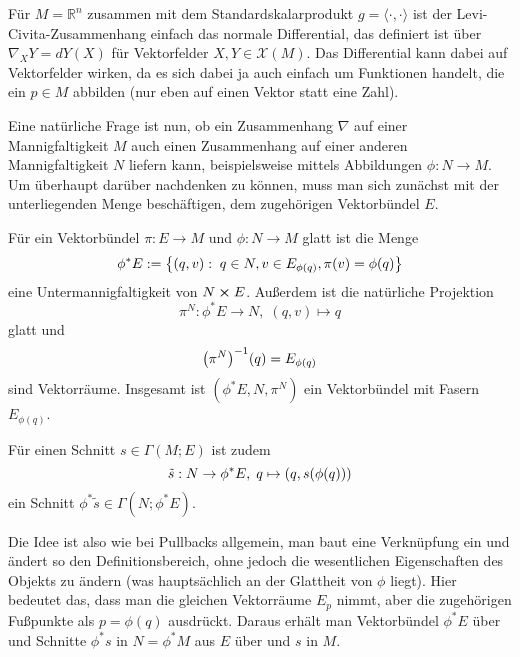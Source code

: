 \documentclass[../H_Analysis_main.tex]{subfiles}
\begin{document}
\begin{bsp}
Für $M = \mathbb{R}^n$ zusammen mit dem Standardskalarprodukt $g = \langle \cdot, \cdot \rangle$ ist der Levi-Civita-Zusammenhang einfach das normale Differential, das definiert ist über $\nabla_X Y = dY(X)$ für Vektorfelder $X, Y \in \mathcal{X}(M)$. Das Differential kann dabei auf Vektorfelder wirken, da es sich dabei ja auch einfach um Funktionen handelt, die ein $p \in M$ abbilden (nur eben auf einen Vektor statt eine Zahl).
\end{bsp}


\iffalse
\begin{bsp}[Zweite Fundamentalform]
machen?
\end{bsp}
\fi


Eine natürliche Frage ist nun, ob ein Zusammenhang $\nabla$ auf einer Mannigfaltigkeit $M$ auch einen Zusammenhang auf einer anderen Mannigfaltigkeit $N$ liefern kann, beispielsweise mittels Abbildungen $\phi: N \rightarrow M$. Um überhaupt darüber nachdenken zu können, muss man sich zunächst mit der unterliegenden Menge beschäftigen, dem zugehörigen Vektorbündel $E$.

\begin{satz}
Für ein Vektorbündel $\pi: E \rightarrow M$ und $\phi: N \rightarrow M$ glatt ist die Menge
\begin{equation}
\phi^* E := \qty{(q, v): \; q \in N, v \in E_{\phi(q)}, \pi(v) = \phi(q)}
\end{equation}
eine Untermannigfaltigkeit von $N \cross E$. Außerdem ist die natürliche Projektion
\begin{equation}
\pi^N: \phi^* E \rightarrow N, \; (q, v) \mapsto q
\end{equation}
glatt und
\begin{equation}
\qty(\pi^N)^{-1}(q) = E_{\phi(q)}
\end{equation}
sind Vektorräume. Insgesamt ist $(\phi^* E, N, \pi^N)$ ein Vektorbündel mit Fasern $E_{\phi(q)}$.

Für einen Schnitt $s \in \Gamma(M; E)$ ist zudem
\begin{equation}
\tilde{s}: N \rightarrow \phi^* E, \; q \mapsto \qty(q, s\qty(\phi(q)))
\end{equation}
ein Schnitt $\phi^* \tilde{s} \in \Gamma(N; \phi^* E)$.
\end{satz}

Die Idee ist also wie bei Pullbacks allgemein, man baut eine Verknüpfung ein und ändert so den Definitionsbereich, ohne jedoch die wesentlichen Eigenschaften des Objekts zu ändern (was hauptsächlich an der Glattheit von $\phi$ liegt). Hier bedeutet das, dass man die gleichen Vektorräume $E_p$ nimmt, aber die zugehörigen Fußpunkte als $p = \phi(q)$ ausdrückt. Daraus erhält man Vektorbündel $\phi^* E$ über und Schnitte $\phi^* s$ in $N = \phi^* M$ aus $E$ über und $s$ in $M$.
\end{document}
